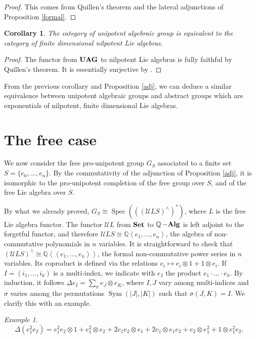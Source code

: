 \documentclass{amsart}
\newtheorem{cor}[thm]{Corollary}
\theoremstyle{definition}
\theoremstyle{remark}
\theoremstyle{remark}
\newtheorem{example}[thm]{Example}
\newcommand{\Q}{\mathbb{Q}}
\newcommand{\mcU}{\mathcal{U}}
\DeclareMathOperator{\Spec}{Spec}
\DeclareMathOperator{\Sym}{Sym}
\DeclareMathOperator{\Alg}{\bf{-Alg}}
\DeclareMathOperator{\Set}{\bf{Set}}
\DeclareMathOperator{\UAG}{\bf{UAG}}
\begin{document}
\begin{proof}
This comes from Quillen's theorem and the lateral adjunctions of Proposition \ref{formal}.
\end{proof}

\begin{cor}
The category of unipotent algebraic group is equivalent to the category of finite dimensional nilpotent Lie algebras.
\end{cor}

\begin{proof}
The functor from $\UAG$ to nilpotent Lie algebras is fully faithful by Quillen's theorem. It is essentially surjective by \cite[Theorem 3.27]{milne-ag}.
\end{proof}

From the previous corollary and Proposition \ref{adj}, we can deduce a similar equivalence between unipotent algebraic groups and abstract groups which are exponentials of nilpotent, finite dimensional Lie algebras.

\section{The free case}\label{free}

We now consider the free pro-unipotent group $G_S$ associated to a finite set $S=\{e_0,\ldots,e_n\}$. By the commutativity of the adjunction of Proposition \ref{adj}, it is isomorphic to the pro-unipotent completion of the free group over $S$, and of the free Lie algebra over $S$.

By what we already proved, $G_S\cong\Spec(((\mcU LS)^\wedge)^*)$, where $L$ is the free Lie algebra functor. The functor $\mcU L$ from $\Set$ to $\Q\Alg$ is left adjoint to the forgetful functor, and therefore $\mcU LS\cong\Q\left\langle e_1,\ldots,e_n\right\rangle$, the algebra of non-commutative polynomials in $n$ variables. It is straightforward to check that $(\mcU LS)^\wedge\cong\Q\left\langle \left\langle e_1,\ldots,e_n\right\rangle\right\rangle$, the formal non-commutative power series in $n$ variables. Its coproduct is defined via the relations $e_i\mapsto e_i\otimes1+1\otimes e_i$. If $I=(i_1,\ldots,i_k)$ is a multi-index, we indicate with $e_I$ the product $e_1\cdot\ldots\cdot e_k$. By induction, it follows $\Delta e_I=\sum_\sigma e_J\otimes e_K$, where $I,J$ vary among multi-indices and $\sigma$ varies among the permutations $\Sym(|J|,|K|)$ such that $\sigma(J,K)=I$. We clarify this with an example.

\begin{example}
\[\Delta( e_1^2e_2 )= e_1^2e_2\otimes1+e_1^2\otimes e_2+2e_1 e_2\otimes e_1+2e_1\otimes e_1e_2+e_2\otimes e_1^2+1\otimes e_1^2e_2.\]
\end{example}
\end{document}
